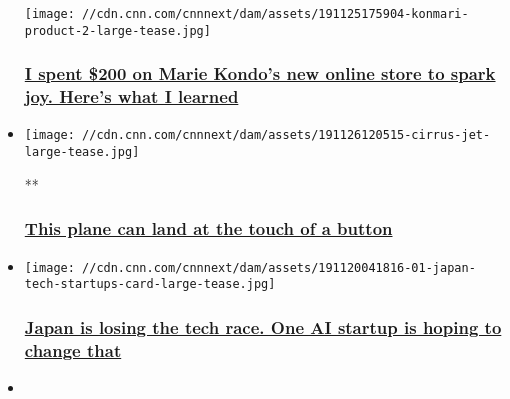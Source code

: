 \begin{itemize}
  \texttt{[image: //cdn.cnn.com/cnnnext/dam/assets/191125175904-konmari-product-2-large-tease.jpg]}

  \hypertarget{i-spent-200-on-marie-kondos-new-online-store-to-spark-joy-heres-what-i-learned}{%
  \subsubsection{\texorpdfstring{\href{/2019/11/27/tech/marie-kondo-store-review/index.html}{I
  spent \$200 on Marie Kondo's new online store to spark joy. Here's
  what I
  learned}}{I spent \$200 on Marie Kondo's new online store to spark joy. Here's what I learned}}\label{i-spent-200-on-marie-kondos-new-online-store-to-spark-joy-heres-what-i-learned}}
\item
  \href{/videos/business/2019/11/26/cirrus-self-landing-plane.cnn-business}{}

  \texttt{[image: //cdn.cnn.com/cnnnext/dam/assets/191126120515-cirrus-jet-large-tease.jpg]}

  **

  \hypertarget{this-plane-can-land-at-the-touch-of-a-button}{%
  \subsubsection{\texorpdfstring{\href{/videos/business/2019/11/26/cirrus-self-landing-plane.cnn-business}{This
  plane can land at the touch of a
  button}}{This plane can land at the touch of a button}}\label{this-plane-can-land-at-the-touch-of-a-button}}
\item
  \href{/2019/11/25/tech/japan-tech-startups/index.html}{}

  \texttt{[image: //cdn.cnn.com/cnnnext/dam/assets/191120041816-01-japan-tech-startups-card-large-tease.jpg]}

  \hypertarget{japan-is-losing-the-tech-race-one-ai-startup-is-hoping-to-change-that}{%
  \subsubsection{\texorpdfstring{\href{/2019/11/25/tech/japan-tech-startups/index.html}{Japan
  is losing the tech race. One AI startup is hoping to change
  that}}{Japan is losing the tech race. One AI startup is hoping to change that}}\label{japan-is-losing-the-tech-race-one-ai-startup-is-hoping-to-change-that}}
\item
  \href{/2019/11/22/tech/facebook-gaming-disguised-toast/index.html}{}


\end{itemize}
